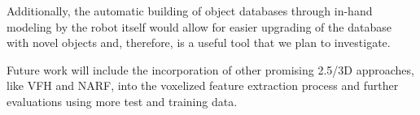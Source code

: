 \documentclass[a4paper, 10 pt, conference]{sty/ieeeconf}
\begin{document}
Additionally, the automatic building of object databases through in-hand modeling by the
robot itself
would allow for easier upgrading of the database with novel objects and, therefore, is a useful tool that we plan to investigate.

Future work will include the incorporation of other promising 2.5/3D approaches, like VFH and NARF,
into the voxelized feature extraction process and further evaluations using more test and training data.




%

\end{document}
